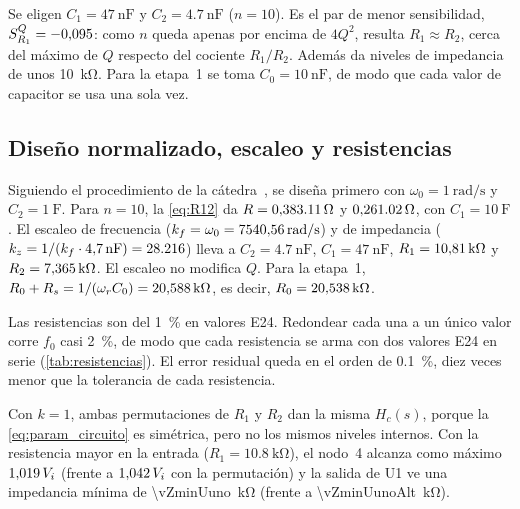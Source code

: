 Se eligen $C_1 = \qty{47}{\nano\farad}$ y $C_2 = \qty{4.7}{\nano\farad}$ ($n = 10$). Es el par de menor sensibilidad,
$S^Q_{R_1} = \num{-0.095}$: como $n$ queda apenas por encima de $4Q^2$, resulta $R_1 \approx R_2$, cerca del máximo de $Q$ respecto del cociente
$R_1/R_2$. Además da niveles de impedancia de unos \qty{10}{\kilo\ohm}. Para la etapa~1 se toma $C_0 = \qty{10}{\nano\farad}$, de modo que cada
valor de capacitor se usa una sola vez.

\subsection{Diseño normalizado, escaleo y resistencias}
Siguiendo el procedimiento de la cátedra~\cite{apuntes2026}, se diseña primero con $\omega_0 = \qty{1}{\radian\per\second}$ y
$C_2 = \qty{1}{\farad}$. Para $n = 10$, la \cref{eq:R12} da $R = \qty{0.38311}{\ohm}$ y $\qty{0.26102}{\ohm}$, con $C_1 = \qty{10}{\farad}$. El
escaleo de frecuencia ($k_f = \omega_0 = \qty{7540.56}{\radian\per\second}$) y de impedancia ($k_z = 1/(k_f\cdot\qty{4.7}{\nano\farad}) = \num{28216}$)
lleva a $C_2 = \qty{4.7}{\nano\farad}$, $C_1 = \qty{47}{\nano\farad}$, $R_1 = \qty{10.81}{\kilo\ohm}$ y $R_2 = \qty{7.365}{\kilo\ohm}$. El escaleo
no modifica $Q$. Para la etapa~1, $R_0 + R_s = 1/(\omega_r C_0) = \qty{20.588}{\kilo\ohm}$, es decir, $R_0 = \qty{20.538}{\kilo\ohm}$.

Las resistencias son del \qty{1}{\percent} en valores E24. Redondear cada una a un único valor corre $f_0$ casi \qty{2}{\percent}, de modo que cada
resistencia se arma con dos valores E24 en serie (\cref{tab:resistencias}). El error residual queda en el orden de \qty{0.1}{\percent}, diez
veces menor que la tolerancia de cada resistencia.

\begin{table}[H]
  \centering\small
  \caption{Resistencias: valor ideal, redondeo a un único valor E24 y realización adoptada con dos resistencias en serie.}
  \label{tab:resistencias}
\end{table}

Con $k = 1$, ambas permutaciones de $R_1$ y $R_2$ dan la misma $H_c(s)$, porque la \cref{eq:param_circuito} es simétrica, pero no los mismos niveles
internos. Con la resistencia mayor en la entrada ($R_1 = \qty{10.8}{\kilo\ohm}$), el nodo~4 alcanza como máximo $\num{1.019}\,V_i$ (frente a
$\num{1.042}\,V_i$ con la permutación) y la salida de U1 ve una impedancia mínima de \qty{\vZminUuno}{\kilo\ohm} (frente a
\qty{\vZminUunoAlt}{\kilo\ohm}).

